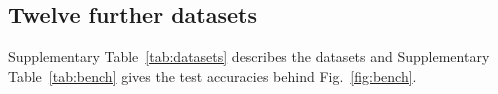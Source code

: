 \begin{table}[htbp]
  \centering
  \caption{MNIST test accuracy (\%) of the amplitude-encoding circuits: the whole image as a normalized amplitude vector of 4 qubits (shrunk to $4\times4$) or 7 qubits ($8\times8$ as it is, $14\times14$ shrunk to $11\times11$), followed by $L$ layers of the block of the serialized circuit and the same readout (60--462 parameters). Mean $\pm$ standard deviation over three seeds; the best mean of each column is in bold.}
  \label{tab:mnist-amp}
  \footnotesize
  \setlength{\tabcolsep}{3pt}
  
\end{table}

\subsection{Twelve further datasets}

Supplementary Table~\ref{tab:datasets} describes the datasets and Supplementary Table~\ref{tab:bench} gives the test accuracies behind Fig.~\ref{fig:bench}.

